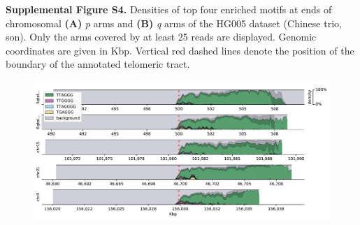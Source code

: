 \documentclass{article}
\begin{document}

\noindent \textbf{Supplemental Figure S4.}
Densities of top four enriched motifs at ends of chromosomal \textbf{(A)} \textit{p} arms and \textbf{(B)} \textit{q} arms of the HG005 dataset (Chinese trio, son).
Only the arms covered by at least 25 reads are displayed.
Genomic coordinates are given in Kbp.
Vertical red dashed lines denote the position of the boundary of the annotated telomeric tract.

\begin{figure}[h] \centering
\includegraphics[width=\textwidth,keepaspectratio]{renders/figures/Figure-S4.pdf}
\end{figure}
\end{document}
